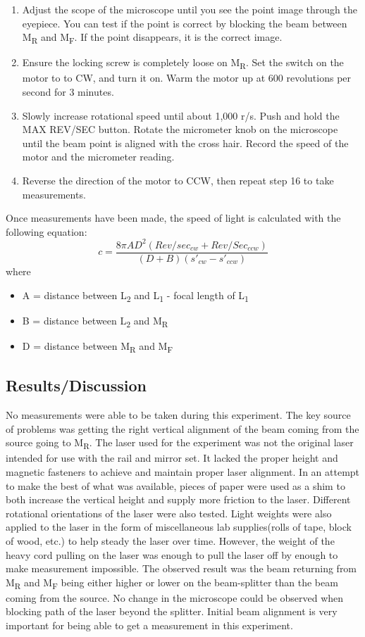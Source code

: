 \documentclass[12pt]{report}
\begin{document}
\begin{enumerate}
	\item Adjust the scope of the microscope until you see the point image through the eyepiece. You can test if the point is correct by blocking the beam between M\textsubscript{R} and M\textsubscript{F}. If the point disappears, it is the correct image.
	\item Ensure the locking screw is completely loose on M\textsubscript{R}. Set the switch on the motor to to CW, and turn it on. Warm the motor up at 600 revolutions per second for 3 minutes.
	\item Slowly increase rotational speed until about 1,000 r/s. Push and hold the MAX REV/SEC button. Rotate the micrometer knob on the microscope until the beam point is aligned with the cross hair. Record  the speed of the motor and the micrometer reading.
	\item Reverse the direction of the motor to CCW, then repeat step 16 to take measurements.
\end{enumerate}
Once measurements have been made, the speed of light is calculated with the following equation:
$$c=\frac{8\pi AD^2(Rev/sec_{cw}+Rev/Sec_{ccw})}{(D+B)(s'_{cw}-s'_{ccw})}$$
where
\begin{itemize}
\item A = distance between L\textsubscript{2} and L\textsubscript{1} - focal length of L\textsubscript{1}
\item B = distance between L\textsubscript{2} and M\textsubscript{R}
\item D = distance between M\textsubscript{R} and M\textsubscript{F}
\end{itemize}

\subsection*{Results/Discussion}
No measurements were able to be taken during this experiment. The key source of problems was getting the right vertical alignment of the beam coming from the source going to M\textsubscript{R}. The laser used for the experiment was not the original laser intended for use with the rail and mirror set. It lacked the proper height and magnetic fasteners to achieve and maintain proper laser alignment. In an attempt to make the best of what was available, pieces of paper were used as a shim to both increase the vertical height and supply more friction to the laser. Different rotational orientations of the laser were also tested. Light weights were also applied to the laser in the form of miscellaneous lab supplies(rolls of tape, block of wood, etc.) to help steady the laser over time. However, the weight of the heavy cord pulling on the laser was enough to pull the laser off by enough to make measurement impossible. The observed result was the beam returning from M\textsubscript{R} and M\textsubscript{F} being either higher or lower on the beam-splitter than the beam coming from the source. No change in the microscope could be observed when blocking path of the laser beyond the splitter. Initial beam alignment is very important for being able to get a measurement in this experiment.\\[10pt]
\end{document}
